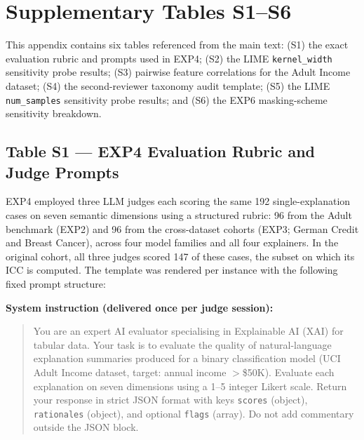 \section{Supplementary Tables S1--S6}
\label{app:supplementary}
\setcounter{table}{0}
\renewcommand{\thetable}{S\arabic{table}}

This appendix contains six tables referenced from the main
text: (S1) the exact evaluation rubric and prompts used in EXP4; (S2) the
LIME \texttt{kernel\_width} sensitivity probe results; (S3) pairwise
feature correlations for the Adult Income dataset; (S4) the
second-reviewer taxonomy audit template; (S5) the LIME \texttt{num\_samples}
sensitivity probe results; and (S6) the EXP6 masking-scheme sensitivity
breakdown.

\subsection*{Table S1 --- EXP4 Evaluation Rubric and Judge Prompts}
\label{sec:supp_exp4_rubric}

EXP4 employed three LLM judges each scoring the same 192 single-explanation
cases on seven semantic dimensions using a structured rubric: 96 from the
Adult benchmark (EXP2) and 96 from the cross-dataset cohorts (EXP3; German
Credit and Breast Cancer), across four model families and all four explainers.
In the original cohort, all three judges scored 147 of these cases, the
subset on which its ICC is computed.
The template was rendered per instance with the following fixed prompt
structure:

\medskip
\noindent\textbf{System instruction (delivered once per judge session):}
\begin{quote}\small
You are an expert AI evaluator specialising in Explainable AI (XAI) for
tabular data. Your task is to evaluate the quality of natural-language
explanation summaries produced for a binary classification model
(UCI Adult Income dataset, target: annual income $>$\$50K). Evaluate each
explanation on seven dimensions using a 1--5 integer Likert scale. Return
your response in strict JSON format with keys \texttt{scores} (object),
\texttt{rationales} (object), and optional \texttt{flags} (array). Do not
add commentary outside the JSON block.
\end{quote}

